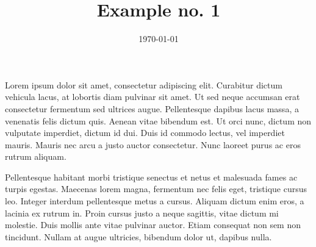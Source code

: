 
\title{Example no. 1}
\date{\today}


\maketitle
Lorem ipsum dolor sit amet, consectetur adipiscing elit. Curabitur dictum vehicula lacus, at lobortis diam pulvinar sit amet. Ut sed neque accumsan erat consectetur fermentum sed ultrices augue. Pellentesque dapibus lacus massa, a venenatis felis dictum quis. Aenean vitae bibendum est. Ut orci nunc, dictum non vulputate imperdiet, dictum id dui. Duis id commodo lectus, vel imperdiet mauris. Mauris nec arcu a justo auctor consectetur. Nunc laoreet purus ac eros rutrum aliquam. 

Pellentesque habitant morbi tristique senectus et netus et malesuada fames ac turpis egestas. Maecenas lorem magna, fermentum nec felis eget, tristique cursus leo. Integer interdum pellentesque metus a cursus. Aliquam dictum enim eros, a lacinia ex rutrum in. Proin cursus justo a neque sagittis, vitae dictum mi molestie. Duis mollis ante vitae pulvinar auctor. Etiam consequat non sem non tincidunt. Nullam at augue ultricies, bibendum dolor ut, dapibus nulla.

